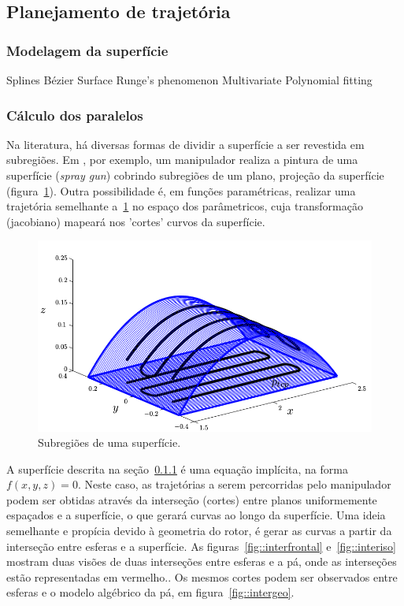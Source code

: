 \subsection{Planejamento de trajetória}

\subsubsection{Modelagem da superfície}\label{modelagem}

Splines
Bézier Surface
Runge's phenomenon
Multivariate Polynomial fitting

\subsubsection{Cálculo dos paralelos}
Na literatura, há diversas formas de dividir a superfície a ser revestida em
subregiões. Em \cite{from2010off}, por exemplo, um manipulador realiza a pintura
de uma superfície (\textit{spray gun}) cobrindo subregiões de um plano, projeção
da superfície (figura~\ref{fig::pal}). Outra possibilidade é, em funções
paramétricas, realizar uma trajetória semelhante a~\ref{fig::pal} no espaço dos
parâmetricos, cuja transformação (jacobiano) mapeará nos 'cortes' curvos da
superfície.

\begin{figure}[!ht]
	\centering	
	\includegraphics[width=.5\columnwidth]{figs/planejamento/pal.png}
	\caption{Subregiões de uma superfície.}
	\label{fig::pal}
\end{figure}


A superfície descrita na seção~\ref{modelagem} é uma equação implícita, na forma
$f(x,y,z)=0$. Neste caso, as trajetórias a serem percorridas pelo manipulador
podem ser obtidas através da interseção (cortes) entre planos uniformemente
espaçados e a superfície, o que gerará curvas ao longo da superfície. Uma ideia
semelhante e propícia devido à geometria do rotor, é gerar as curvas a partir da interseção
entre esferas e a superfície. As figuras~\ref{fig::interfrontal}
e~\ref{fig::interiso} mostram duas visões de duas interseções entre esferas e
a pá, onde as interseções estão representadas em vermelho.. Os mesmos cortes
podem ser observados entre esferas e o modelo algébrico da pá, em figura~\ref{fig::intergeo}.


